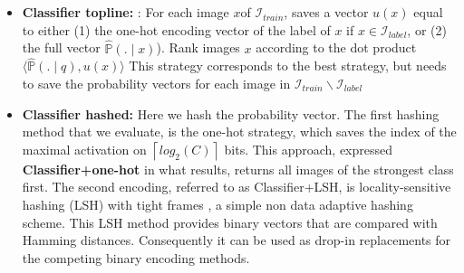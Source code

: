 \documentclass{article}
\begin{document}
\\\\
\begin{itemize}

\item \textbf{Classifier topline: }: For each image $x$of $\mathcal{I}_{train}$, saves a vector $u(x)$ equal to either (1) the one-hot encoding vector of the label of $x$ if $x \in \mathcal{I}_{label}$, or (2) the full  vector  $\hat{\mathbb{P}}(.\mid x)$). Rank images $x$ according to the dot product $\langle\hat{\mathbb{P}}(.\mid q), u(x)\rangle$  This strategy corresponds to the best strategy, but needs to save the probability vectors for each image in $\mathcal{I}_{train} \backslash \mathcal{I}_{label}$


\item \textbf{Classifier hashed: } Here we hash the probability vector. The first hashing method that we evaluate, is the one-hot strategy, which saves the index of the maximal activation on $\left \lceil log_2(C) \right \rceil$ bits. This approach, expressed \textbf{Classifier+one-hot} in what results, returns all images of the strongest class first. The second encoding, referred to as Classifier+LSH, is locality-sensitive hashing (LSH) with tight frames \cite{jegou2012anti}, a simple non data adaptive hashing scheme. This LSH method provides binary vectors that are compared with Hamming distances. Consequently it can be used as drop-in replacements for the competing binary encoding methods.
\end{itemize}
\end{document}
